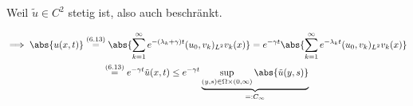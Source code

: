 \begin{solution}
\begin{enumerate}[label = (\roman*)]
  Weil $\tilde u \in C^2$ stetig ist, also auch beschränkt.

  \begin{multline*}
    \implies
    \abs{u(x, t)}
    \stackrel
    {
      \mathrm{(6.13)}
    }{=}
    \abs
    {
      \sum_{k=1}^\infty
      e^{-(\lambda_k + \gamma) t}
      (u_0, v_k)_{L^2}
      v_k(x)
    }
    =
    e^{-\gamma t}
    \abs
    {
      \sum_{k=1}^\infty
      e^{-\lambda_k t}
      (u_0, v_k)_{L^2}
      v_k(x)
    } \\
    \stackrel
    {
      \mathrm{(6.13)}
    }{=}
    e^{-\gamma t} \tilde u(x, t)
    \leq
    e^{-\gamma t}
    \underbrace
    {
      \sup_{(y, s) \in \Omega \times (0, \infty)}
      \abs{\tilde u(y, s)}
    }_{
      =: C_\infty
    }
  \end{multline*}

\end{enumerate}

\end{solution}


